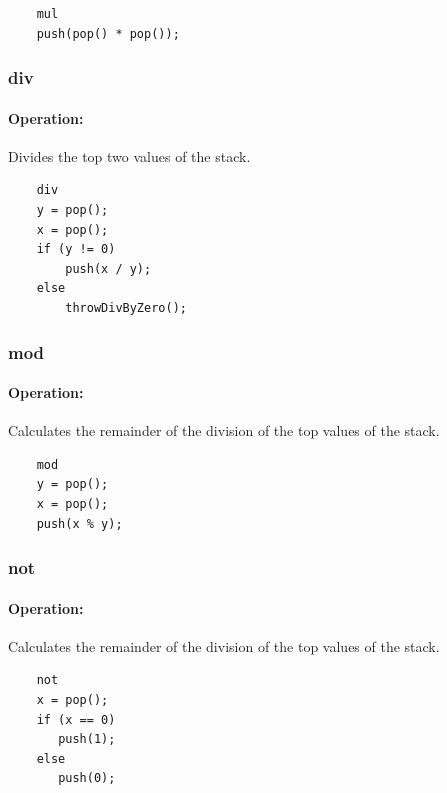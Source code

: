 	\begin{lstlisting}
	mul
	push(pop() * pop());
	\end{lstlisting}

\subsubsection{div}

\paragraph{Operation:}
Divides the top two values of the stack.

	\begin{lstlisting}
	div
	y = pop();
	x = pop();
	if (y != 0)
		push(x / y);
	else
		throwDivByZero();
	\end{lstlisting}


\subsubsection{mod}

\paragraph{Operation:}
Calculates the remainder of the division of the top values of the stack.

	\begin{lstlisting}
	mod
	y = pop();
	x = pop();
	push(x % y);
	\end{lstlisting}

\subsubsection{not}

\paragraph{Operation:}
Calculates the remainder of the division of the top values of the stack.

	\begin{lstlisting}
	not
	x = pop();
	if (x == 0)
	   push(1);
	else
	   push(0);
	\end{lstlisting}

